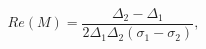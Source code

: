 \begin{equation}
Re(M) = \frac{\Delta_2 - \Delta_1}
{2\Delta_1\Delta_2(\sigma_1-\sigma_2)} ,
\end{equation}

